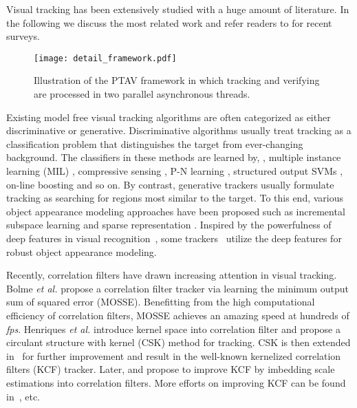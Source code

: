 \documentclass[10pt,twocolumn,letterpaper]{article}
\begin{document}
Visual tracking has been extensively studied with a huge amount of literature. In the following we discuss the most related work and refer readers to \cite{YilmazJS06survey,smeulders2014visual} for recent surveys.

\begin{figure*}[!t]
\centering
\texttt{[image: detail\_framework.pdf]}\\
\caption{Illustration of the PTAV framework in which tracking and verifying are processed in two parallel asynchronous threads.}
\label{detail_PTV}
\end{figure*}

\vspace{0.4em}
 Existing model free visual tracking algorithms are often categorized as either discriminative or generative. Discriminative algorithms usually treat tracking as a classification problem that distinguishes the target from ever-changing background. The classifiers in these methods are learned by, \eg, multiple instance learning (MIL) \cite{babenko2011robust}, compressive sensing \cite{zhang2012real}, P-N learning \cite{kalal2012tracking}, structured output SVMs \cite{hare2016struck}, on-line boosting \cite{grabner2008semi} and so on.
By contrast, generative trackers usually formulate tracking as searching for regions most similar to the target. To this end, various object appearance modeling approaches have been proposed such as incremental subspace learning \cite{ross2008incremental} and sparse representation \cite{mei2009robust,bao2012real,fan2017robust}. Inspired by the powerfulness of deep features in visual recognition~\cite{krizhevsky2012imagenet,simonyan2014very}, some trackers~\cite{ma2015hierarchical,nam2016learning, fan2016sanet,wang2013learning} utilize the deep features for robust object appearance modeling. 

Recently, correlation filters have drawn increasing attention in visual tracking. Bolme {\it et al.} \cite{bolme2010visual} propose a correlation filter tracker via learning the minimum output sum of squared error (MOSSE). Benefitting from the high computational efficiency of correlation filters, MOSSE achieves an amazing speed at hundreds of \emph{fps}. Henriques {\it et al.} \cite{henriques2012exploiting} introduce kernel space into correlation filter and propose a circulant structure with kernel (CSK) method for tracking. CSK is then extended in~\cite{henriques2015high} for further improvement and result in the well-known kernelized correlation filters (KCF) tracker. Later, \cite{danelljan2016discriminative} and \cite{li2014scale} propose to improve KCF by imbedding scale estimations into correlation filters. More efforts on improving KCF can be found in~\cite{liu2015real,ma2015long}, etc.
\end{document}
